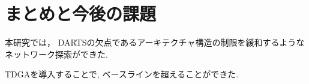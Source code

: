 \documentclass[a4paper,twoside,twocolumn,10pt]{article}
\begin{document}
%

\section{まとめと今後の課題}
本研究では，
%
DARTSの欠点であるアーキテクチャ構造の制限を緩和するようなネットワーク探索ができた.


TDGAを導入することで, ベースラインを超えることができた.





\end{document}

